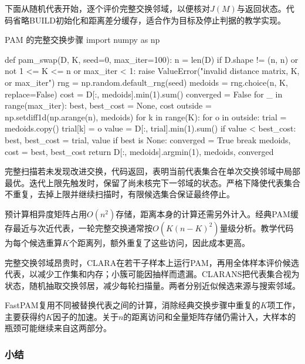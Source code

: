下面从随机代表开始，逐个评价完整交换邻域，以便核对$J(M)$与返回状态。代码省略BUILD初始化和距离差分缓存，适合作为目标及停止判据的教学实现。

\begin{codeblock}[language=Python,label={code:clustering-pam}]{PAM 的完整交换步骤}
import numpy as np

def pam_swap(D, K, seed=0, max_iter=100):
    n = len(D)
    if D.shape != (n, n) or not 1 <= K <= n or max_iter < 1:
        raise ValueError("invalid distance matrix, K, or max_iter")
    rng = np.random.default_rng(seed)
    medoids = rng.choice(n, K, replace=False)
    cost = D[:, medoids].min(1).sum()
    converged = False
    for _ in range(max_iter):
        best, best_cost = None, cost
        outside = np.setdiff1d(np.arange(n), medoids)
        for k in range(K):
            for o in outside:
                trial = medoids.copy()
                trial[k] = o
                value = D[:, trial].min(1).sum()
                if value < best_cost:
                    best, best_cost = trial, value
        if best is None:
            converged = True
            break
        medoids, cost = best, best_cost
    return D[:, medoids].argmin(1), medoids, converged
\end{codeblock}

完整扫描若未发现改进交换，代码返回，表明当前代表集合在单次交换邻域中局部最优。迭代上限先触发时，保留了尚未核完下一邻域的状态。严格下降使代表集合不重复，去掉上限并继续扫描时，有限候选集合保证最终停止。

预计算相异度矩阵占用$O(n^2)$存储，距离本身的计算还需另外计入。经典PAM缓存最近与次近代表，一轮完整交换通常按$O(K(n-K)^2)$量级分析。教学代码为每个候选重算$K$个距离列，额外重复了这些访问，因此成本更高。

完整交换邻域昂贵时，CLARA在若干子样本上运行PAM，再用全体样本评价候选代表，以减少工作集和内存；小簇可能因抽样而遗漏。CLARANS把代表集合视为状态，随机抽取交换邻居，减少每轮扫描量。两者分别近似候选来源与搜索邻域。

FastPAM复用不同被替换代表之间的计算，消除经典交换步骤中重复的$K$项工作，主要获得约$K$因子的加速。关于$n$的距离访问和全量矩阵存储仍需计入，大样本的瓶颈可能继续来自这两部分。

\subsubsection{小结}

